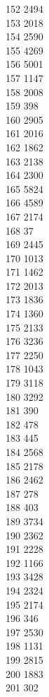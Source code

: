 { 152	2494 \\
 153	2018 \\
 154	2590 \\
 155	4269 \\
 156	5001 \\
 157	1147 \\
 158	2008 \\
 159	398 \\
 160	2905 \\
 161	2016 \\
 162	1862 \\
 163	2138 \\
 164	2300 \\
 165	5824 \\
 166	4589 \\
 167	2174 \\
 168	37 \\
 169	2445 \\
 170	1013 \\
 171	1462 \\
 172	2013 \\
 173	1836 \\
 174	1360 \\
 175	2133 \\
 176	3236 \\
 177	2250 \\
 178	1043 \\
 179	3118 \\
 180	3292 \\
 181	390 \\
 182	478 \\
 183	445 \\
 184	2568 \\
 185	2178 \\
 186	2462 \\
 187	278 \\
 188	403 \\
 189	3734 \\
 190	2362 \\
 191	2228 \\
 192	1166 \\
 193	3428 \\
 194	2324 \\
 195	2174 \\
 196	346 \\
 197	2530 \\
 198	1131 \\
 199	2815 \\
 200	1883 \\
 201	302 \\
}
